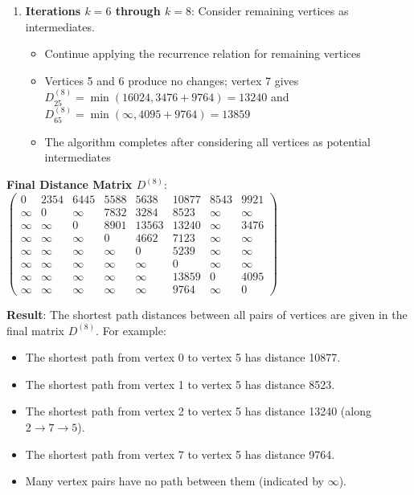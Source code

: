 \documentclass{article}
\theoremstyle{definition}
\begin{document}
\begin{enumerate}
\item \textbf{Iterations $k=6$ through $k=8$}: Consider remaining vertices as intermediates.
   \begin{itemize}
   \item Continue applying the recurrence relation for remaining vertices
   \item Vertices 5 and 6 produce no changes; vertex 7 gives $D^{(8)}_{25} = \min(16024, 3476 + 9764) = 13240$ and $D^{(8)}_{65} = \min(\infty, 4095 + 9764) = 13859$
   \item The algorithm completes after considering all vertices as potential intermediates
   \end{itemize}
\end{enumerate}

\noindent\textbf{Final Distance Matrix $D^{(8)}$}:
$\begin{pmatrix}
0 & 2354 & 6445 & 5588 & 5638 & 10877 & 8543 & 9921 \\
\infty & 0 & \infty & 7832 & 3284 & 8523 & \infty & \infty \\
\infty & \infty & 0 & 8901 & 13563 & 13240 & \infty & 3476 \\
\infty & \infty & \infty & 0 & 4662 & 7123 & \infty & \infty \\
\infty & \infty & \infty & \infty & 0 & 5239 & \infty & \infty \\
\infty & \infty & \infty & \infty & \infty & 0 & \infty & \infty \\
\infty & \infty & \infty & \infty & \infty & 13859 & 0 & 4095 \\
\infty & \infty & \infty & \infty & \infty & 9764 & \infty & 0
\end{pmatrix}$

\noindent\textbf{Result}: The shortest path distances between all pairs of vertices are given in the final matrix $D^{(8)}$. For example:
\begin{itemize}
\item The shortest path from vertex 0 to vertex 5 has distance 10877.
\item The shortest path from vertex 1 to vertex 5 has distance 8523.
\item The shortest path from vertex 2 to vertex 5 has distance 13240 (along $2 \rightarrow 7 \rightarrow 5$).
\item The shortest path from vertex 7 to vertex 5 has distance 9764.
\item Many vertex pairs have no path between them (indicated by $\infty$).
\end{itemize}
\end{document}

